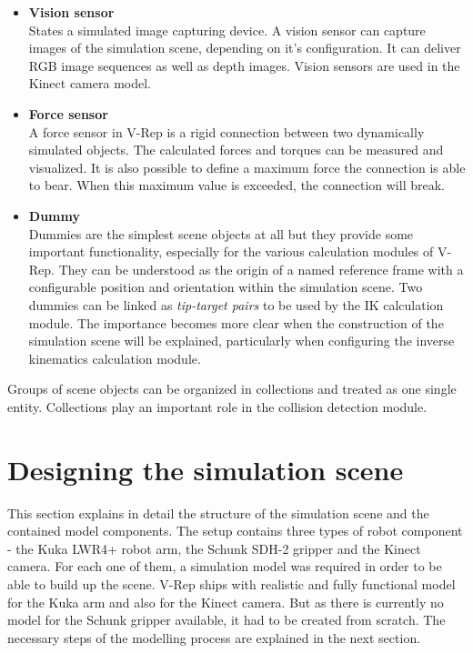 \begin{itemize}
\item \textbf{Vision sensor} \\
States a simulated image capturing device. A vision sensor can capture images of the simulation scene, depending on it's configuration. It can deliver RGB image sequences as well as depth images. Vision sensors are used in the Kinect camera model.

\item \textbf{Force sensor} \\
A force sensor in V-Rep is a rigid connection between two dynamically simulated objects. The calculated forces and torques can be measured and visualized. It is also possible to define a maximum force the connection is able to bear. When this maximum value is exceeded, the connection will break.

\item \textbf{Dummy} \\
Dummies are the simplest scene objects at all but they provide some important functionality, especially for the various calculation modules of V-Rep. They can be understood as the origin of a named reference frame with a configurable position and orientation within the simulation scene. Two dummies can be linked as \emph{tip-target pairs} to be used by the IK calculation module. The importance becomes more clear when the construction of the simulation scene will be explained, particularly when configuring the inverse kinematics calculation module. 

\end{itemize}

Groups of scene objects can be organized in collections and treated as one single entity. Collections play an important role in the collision detection module.


\section{Designing the simulation scene}
This section explains in detail the structure of the simulation scene and the contained model components. The setup contains three types of robot component - the Kuka LWR4+ robot arm, the Schunk SDH-2 gripper and the Kinect camera. For each one of them, a simulation model was required in order to be able to build up the scene. V-Rep ships with realistic and fully functional model for the Kuka arm and also for the Kinect camera. But as there is currently no model for the Schunk gripper available, it had to be created from scratch. The necessary steps of the modelling process are explained in the next section.

